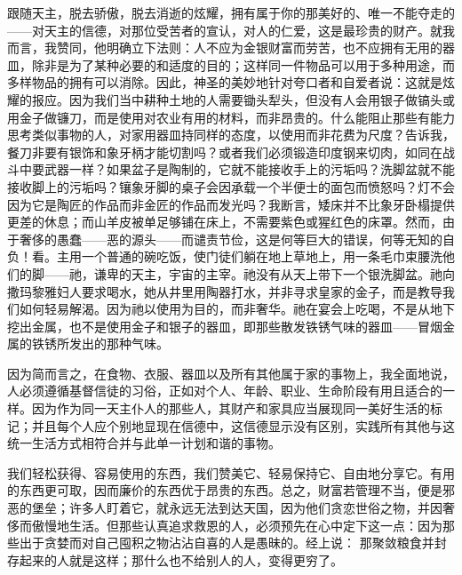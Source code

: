 跟随天主，脱去骄傲，脱去消逝的炫耀，拥有属于你的那美好的、唯一不能夺走的——对天主的信德，对那位受苦者的宣认，对人的仁爱，这是最珍贵的财产。就我而言，我赞同，他明确立下法则：人不应为金银财富而劳苦，也不应拥有无用的器皿，除非是为了某种必要的和适度的目的；这样同一件物品可以用于多种用途，而多样物品的拥有可以消除。因此，神圣的美妙地针对夸口者和自爱者说：这就是炫耀的报应。因为我们当中耕种土地的人需要锄头犁头，但没有人会用银子做镐头或用金子做镰刀，而是使用对农业有用的材料，而非昂贵的。什么能阻止那些有能力思考类似事物的人，对家用器皿持同样的态度，以使用而非花费为尺度？告诉我，餐刀非要有银饰和象牙柄才能切割吗？或者我们必须锻造印度钢来切肉，如同在战斗中要武器一样？如果盆子是陶制的，它就不能接收手上的污垢吗？洗脚盆就不能接收脚上的污垢吗？镶象牙脚的桌子会因承载一个半便士的面包而愤怒吗？灯不会因为它是陶匠的作品而非金匠的作品而发光吗？我断言，矮床并不比象牙卧榻提供更差的休息；而山羊皮被单足够铺在床上，不需要紫色或猩红色的床罩。然而，由于奢侈的愚蠢——恶的源头——而谴责节俭，这是何等巨大的错误，何等无知的自负！看。主用一个普通的碗吃饭，使门徒们躺在地上草地上，用一条毛巾束腰洗他们的脚——祂，谦卑的天主，宇宙的主宰。祂没有从天上带下一个银洗脚盆。祂向撒玛黎雅妇人要求喝水，她从井里用陶器打水，并非寻求皇家的金子，而是教导我们如何轻易解渴。因为祂以使用为目的，而非奢华。祂在宴会上吃喝，不是从地下挖出金属，也不是使用金子和银子的器皿，即那些散发铁锈气味的器皿——冒烟金属的铁锈所发出的那种气味。\par

因为简而言之，在食物、衣服、器皿以及所有其他属于家的事物上，我全面地说，人必须遵循基督信徒的习俗，正如对个人、年龄、职业、生命阶段有用且适合的一样。因为作为同一天主仆人的那些人，其财产和家具应当展现同一美好生活的标记；并且每个人应个别地显现在信德中，这信德显示没有区别，实践所有其他与这统一生活方式相符合并与此单一计划和谐的事物。\par

我们轻松获得、容易使用的东西，我们赞美它、轻易保持它、自由地分享它。有用的东西更可取，因而廉价的东西优于昂贵的东西。总之，财富若管理不当，便是邪恶的堡垒；许多人盯着它，就永远无法到达天国，因为他们贪恋世俗之物，并因奢侈而傲慢地生活。但那些认真追求救恩的人，必须预先在心中定下这一点：因为那些出于贪婪而对自己囤积之物沾沾自喜的人是愚昧的。经上说： 那聚敛粮食并封存起来的人就是这样；那什么也不给别人的人，变得更穷了。\par

